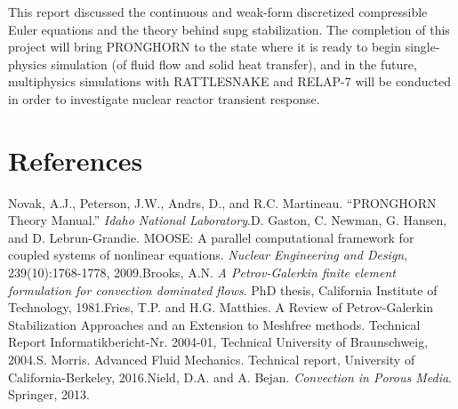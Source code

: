 \documentclass[10pt]{article}
\numberwithin{equation}{section} %
\begin{document}
This report discussed the continuous and weak-form discretized compressible Euler equations and the theory behind \gls{supg} stabilization. The completion of this project will bring PRONGHORN to the state where it is ready to begin single-physics simulation (of fluid flow and solid heat transfer), and in the future, multiphysics simulations with RATTLESNAKE and RELAP-7 will be conducted in order to investigate nuclear reactor transient response. 

\section{References}

\begin{flushleft}
[1]\quad Novak, A.J., Peterson, J.W., Andrs, D., and R.C. Martineau. ``PRONGHORN Theory Manual.'' \textit{Idaho National Laboratory}.\newline\newline
[2]\quad D. Gaston, C. Newman, G. Hansen, and D. Lebrun-Grandie. MOOSE: A parallel computational framework for coupled systems of nonlinear equations. \textit{Nuclear Engineering and Design}, 239(10):1768-1778, 2009.\newline\newline
[3]\quad Brooks, A.N. \textit{A Petrov-Galerkin finite element formulation for convection dominated flows}. PhD thesis, California Institute of Technology, 1981.\newline\newline
[4]\quad Fries, T.P. and H.G. Matthies. A Review of Petrov-Galerkin Stabilization Approaches and an Extension to Meshfree methods. Technical Report Informatikbericht-Nr. 2004-01, Technical University of Braunschweig, 2004.\newline\newline
[5]\quad S. Morris. Advanced Fluid Mechanics. Technical report, University of California-Berkeley, 2016.\newline\newline
[6]\quad Nield, D.A. and A. Bejan. \textit{Convection in Porous Media}. Springer, 2013.

\end{flushleft}
\end{document}
